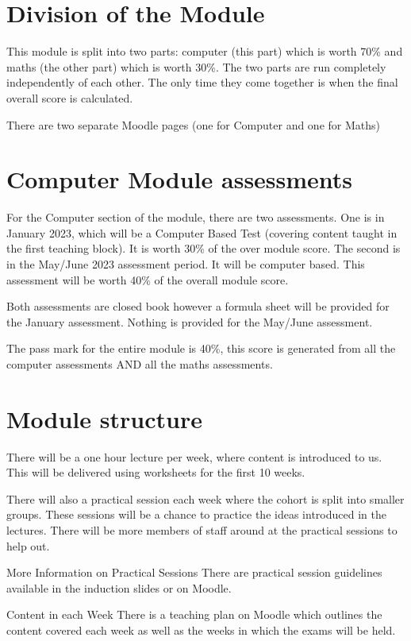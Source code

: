 
\section*{Division of the Module}
This module is split into two parts: computer (this part) which is worth 70\% and maths (the other part) which is worth 30\%. The two parts are run completely independently of each other. The only time they come together is when the final overall score is calculated. 

There are two separate Moodle pages (one for Computer and one for Maths)

\section*{Computer Module assessments}
For the Computer section of the module, there are two assessments. One is in January 2023, which will be a Computer Based Test (covering content taught in the first teaching block). It is worth 30\% of the over module score. The second is in the May/June 2023 assessment period. It will be computer based. This assessment will be worth 40\% of the overall module score.

Both assessments are closed book however a formula sheet will be provided for the January assessment. Nothing is provided for the May/June assessment.

The pass mark for the entire module is 40\%, this score is generated from all the computer assessments AND all the maths assessments.

\section*{Module structure}
There will be a one hour lecture per week, where content is introduced to us. This will be delivered using worksheets for the first 10 weeks.

There will also a practical session each week where the cohort is split into smaller groups. These sessions will be a chance to practice the ideas introduced in the lectures. There will be more members of staff around at the practical sessions to help out.
\begin{link}{More Information on Practical Sessions}
There are practical session guidelines available in the induction slides or on Moodle.
\end{link}

\begin{link}{Content in each Week}
There is a teaching plan on Moodle which outlines the content covered each week as well as the weeks in which the exams will be held.
\end{link}
